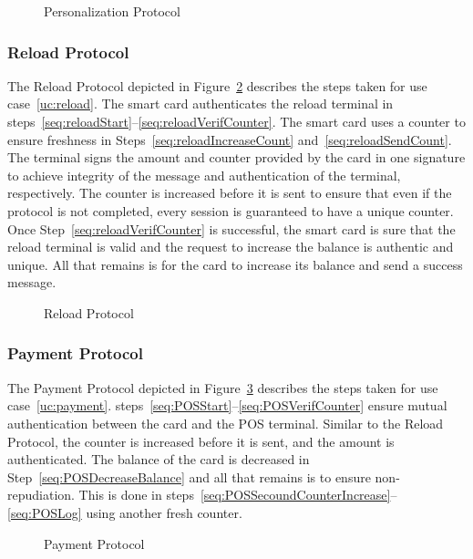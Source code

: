  \begin{figure}[h!]
     \centering
     
     \caption{Personalization Protocol}
     \label{fig:PersonProtocol}
 \end{figure}

\subsubsection{Reload Protocol}
The Reload Protocol depicted in Figure~\ref{fig:ReloadProtocol} describes the steps taken for use case~\ref{uc:reload}.
The smart card authenticates the reload terminal in steps~\ref{seq:reloadStart}--\ref{seq:reloadVerifCounter}.
The smart card uses a counter to ensure freshness in Steps~\ref{seq:reloadIncreaseCount} and~\ref{seq:reloadSendCount}.
The terminal signs the amount and counter provided by the card in one signature to achieve integrity of the message and authentication of the terminal, respectively.
The counter is increased before it is sent to ensure that even if the protocol is not completed, every session is guaranteed to have a unique counter.
Once Step~\ref{seq:reloadVerifCounter} is successful, the smart card is sure that the reload terminal is valid and the request to increase the balance is authentic and unique.
All that remains is for the card to increase its balance and send a success message.
 \begin{figure}[h!]
     \centering
     
     \caption{Reload Protocol}
     \label{fig:ReloadProtocol}
 \end{figure}

\subsubsection{Payment Protocol}
The Payment Protocol depicted in Figure~\ref{fig:POSProtocol} describes the steps taken for use case~\ref{uc:payment}.
steps~\ref{seq:POSStart}--\ref{seq:POSVerifCounter} ensure mutual authentication between the card and the POS terminal.
Similar to the Reload Protocol, the counter is increased before it is sent, and the amount is authenticated.
The balance of the card is decreased in Step~\ref{seq:POSDecreaseBalance} and all that remains is to ensure non-repudiation.
This is done in steps~\ref{seq:POSSecoundCounterIncrease}--\ref{seq:POSLog} using another fresh counter.
\begin{figure}[h!]
    \centering
    
    \caption{Payment Protocol}
    \label{fig:POSProtocol}
\end{figure}


